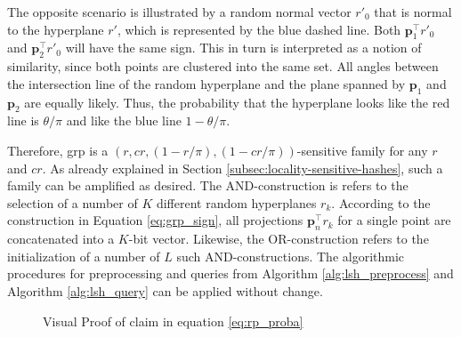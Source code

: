 \documentclass[../../../main.tex]{subfiles}
\begin{document}
The opposite scenario is illustrated by a random normal vector $r'_0$ that is normal to the hyperplane $r'$, which is represented by the blue dashed line. Both $\bm{p}_1^\top r'_0$ and  $\bm{p}_2^\top r'_0$ will have the same sign. This in turn is interpreted as a notion of similarity, since both points are clustered into the same set. All angles between the intersection line of the random hyperplane and the plane spanned by $\bm{p}_1$ and $\bm{p}_2$ are equally likely. Thus, the probability that the hyperplane looks like the red line is $\theta / \pi$ and like the blue line $1 - \theta / \pi$.

Therefore, \gls{grp} is a $(r, cr, (1-r/\pi), (1-cr/\pi))$-sensitive family for any $r$ and $cr$. As already explained in Section \ref{subsec:locality-sensitive-hashes}, such a family can be amplified as desired. The AND-construction is refers to the selection of a number of $K$ different random hyperplanes $r_k$. According to the construction in Equation \ref{eq:grp_sign}, all projections $\bm{p}_n^\top r_k$ for a single point are concatenated into a $K$-bit vector. Likewise, the OR-construction refers to the initialization of a number of $L$ such AND-constructions. The algorithmic procedures for preprocessing and queries from Algorithm \ref{alg:lsh_preprocess} and Algorithm \ref{alg:lsh_query} can be applied without change. 

\begin{figure}[t]
    \centering
    
    \caption{Visual Proof of claim in equation \ref{eq:rp_proba}}
    \label{fig:rp_2d}
\end{figure}
\end{document}
